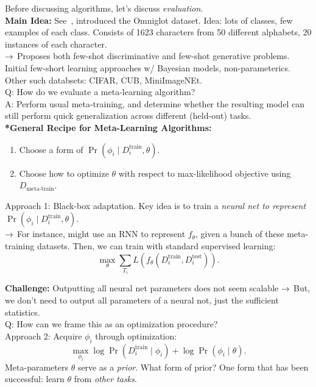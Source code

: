 Before discussing algorithms, let's discuss {\it evaluation}. \\

{\bf Main Idea:} See~\citet{lake2015human}, introduced the Omniglot dataset. Idea: lots of classes, few examples of each class. Consists of 1623 characters from 50 different alphabets, 20 instances of each character. \\

$\rightarrow$ Proposes both few-shot discriminative and few-shot generative problems. Initial few-short learning approaches w/ Bayesian models, non-parameterics. Other such databsets: CIFAR, CUB, MiniImageNEt. \\

Q: How do we evaluate a meta-learning algorithm? \\

A: Perform usual meta-training, and determine whether the resulting model can still perform quick generalization across different (held-out) tasks. \\

{\bf **General Recipe for Meta-Learning Algorithms:}
\begin{enumerate}
\item Choose a form of $\Pr(\phi_i \mid D_i^{\text{train}}, \theta)$.
\item Choose how to optimize $\theta$ with respect to max-likelihood objective using $D_{\text{meta-train}}$.
\end{enumerate}

Approach 1: Black-box adaptation. Key idea is to train a {\it neural net to represent} $\Pr(\phi_i \mid D_i^{\text{train}}, \theta)$. \\

$\rightarrow$ For instance, might use an RNN to represent $f_\theta$, given a bunch of these meta-training datasets. Then, we can train with standard supervised learning:
\[
\max_\theta \sum_{T_i} L(f_\theta(D_i^{\text{train}}, D_i^{\text{test}})).
\]

{\bf Challenge:} Outputting all neural net parameters does not seem scalable
$\rightarrow$ But, we don't need to output all parameters of a neural not, just the sufficient statistics. \\

Q: How can we frame this as an optimization procedure? \\

Approach 2: Acquire $\phi_i$ through optimization:
\[
\max_{\phi_i} \log \Pr(D_i^{\text{train}} \mid \phi_i) + \log \Pr(\phi_i \mid \theta).
\]
Meta-parameters $\theta$ serve as a {\it prior}. What form of prior? One form that has been successful: learn $\theta$ from {\it other tasks}. \\

